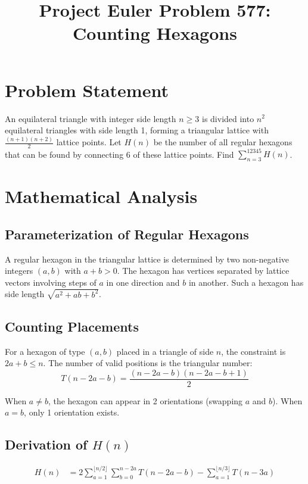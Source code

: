 \documentclass[12pt]{article}
\title{Project Euler Problem 577: Counting Hexagons}
\author{}
\date{}
\begin{document}
\maketitle

\section{Problem Statement}
An equilateral triangle with integer side length $n \geq 3$ is divided into $n^2$ equilateral triangles with side length 1, forming a triangular lattice with $\frac{(n+1)(n+2)}{2}$ lattice points. Let $H(n)$ be the number of all regular hexagons that can be found by connecting 6 of these lattice points. Find $\displaystyle\sum_{n=3}^{12345} H(n)$.

\section{Mathematical Analysis}

\subsection{Parameterization of Regular Hexagons}
A regular hexagon in the triangular lattice is determined by two non-negative integers $(a, b)$ with $a + b > 0$. The hexagon has vertices separated by lattice vectors involving steps of $a$ in one direction and $b$ in another. Such a hexagon has side length $\sqrt{a^2 + ab + b^2}$.

\subsection{Counting Placements}
For a hexagon of type $(a, b)$ placed in a triangle of side $n$, the constraint is $2a + b \leq n$. The number of valid positions is the triangular number:
\[
T(n - 2a - b) = \frac{(n-2a-b)(n-2a-b+1)}{2}
\]

When $a \neq b$, the hexagon can appear in 2 orientations (swapping $a$ and $b$). When $a = b$, only 1 orientation exists.

\subsection{Derivation of $H(n)$}
\begin{align}
H(n) &= 2\sum_{a=1}^{\lfloor n/2 \rfloor} \sum_{b=0}^{n-2a} T(n-2a-b) - \sum_{a=1}^{\lfloor n/3 \rfloor} T(n-3a)
\end{align}
\end{document}

